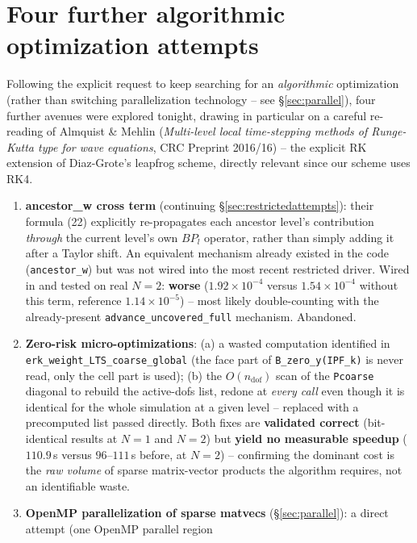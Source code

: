 \documentclass[11pt]{article}
\begin{document}
\section{Four further algorithmic optimization attempts}
\label{sec:moreattempts}

Following the explicit request to keep searching for an
\emph{algorithmic} optimization (rather than switching parallelization
technology -- see \S\ref{sec:parallel}), four further avenues were
explored tonight, drawing in particular on a careful re-reading of
Almquist \& Mehlin (\emph{Multi-level local time-stepping methods of
Runge-Kutta type for wave equations}, CRC Preprint 2016/16) -- the
explicit RK extension of Diaz-Grote's leapfrog scheme, directly
relevant since our scheme uses RK4.

\begin{enumerate}
  \item \textbf{ancestor\_w cross term} (continuing
  \S\ref{sec:restrictedattempts}): their formula (22) explicitly
  re-propagates each ancestor level's contribution \emph{through} the
  current level's own $B P_l$ operator, rather than simply adding it
  after a Taylor shift. An equivalent mechanism already existed in the
  code (\texttt{ancestor\_w}) but was not wired into the most recent
  restricted driver. Wired in and tested on real $N=2$: \textbf{worse}
  ($1.92\times10^{-4}$ versus $1.54\times10^{-4}$ without this term,
  reference $1.14\times10^{-5}$) -- most likely double-counting with
  the already-present \texttt{advance\_uncovered\_full} mechanism.
  Abandoned.
  \item \textbf{Zero-risk micro-optimizations}: (a) a wasted computation
  identified in \texttt{erk\_weight\_LTS\_coarse\_global} (the face part
  of \texttt{B\_zero\_y(IPF\_k)} is never read, only the cell part is
  used); (b) the $O(n_{\text{dof}})$ scan of the \texttt{Pcoarse}
  diagonal to rebuild the active-dofs list, redone at \emph{every call}
  even though it is identical for the whole simulation at a given
  level -- replaced with a precomputed list passed directly. Both fixes
  are \textbf{validated correct} (bit-identical results at $N=1$ and
  $N=2$) but \textbf{yield no measurable speedup} ($110.9$\,s versus
  $96$--$111$\,s before, at $N=2$) -- confirming the dominant cost is the
  \emph{raw volume} of sparse matrix-vector products the algorithm
  requires, not an identifiable waste.
  \item \textbf{OpenMP parallelization of sparse matvecs}
  (\S\ref{sec:parallel}): a direct attempt (one OpenMP parallel region

\end{enumerate}
\end{document}
